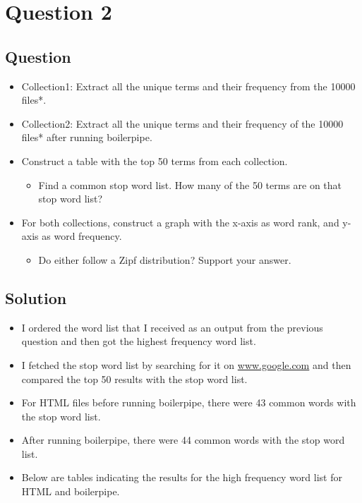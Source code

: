\chapter{Question 2}
\label{question-2}
\section{Question}



\begin{itemize}
\item Collection1: Extract all the unique terms and their frequency from the 10000 files{*}.
\item Collection2: Extract all the unique terms and their frequency of the 10000 files{*} after running boilerpipe.
\item Construct a table with the top 50 terms from each collection. 
	\begin{itemize}
	\item Find a common stop word list.  How many of the 50 terms are on that stop word list?
	\end{itemize}
\item For both collections, construct a graph with the x-axis as word rank, and y-axis as word frequency.
	\begin{itemize}
	\item Do either follow a Zipf distribution? Support your answer.
	\end{itemize}	
\end{itemize}

\section{Solution}

\begin{itemize}
\item I ordered the word list that I received as an output from the previous question and then got the highest frequency word list.
\item I fetched the stop word list by searching for it on \url{www.google.com} and then compared the top 50 results with the stop word list.
\item For HTML files before running boilerpipe, there were 43 common words with the stop word list.
\item After running boilerpipe, there were 44 common words with the stop word list.
\item Below are tables indicating the results for the high frequency word list for HTML and boilerpipe.
\end{itemize}

